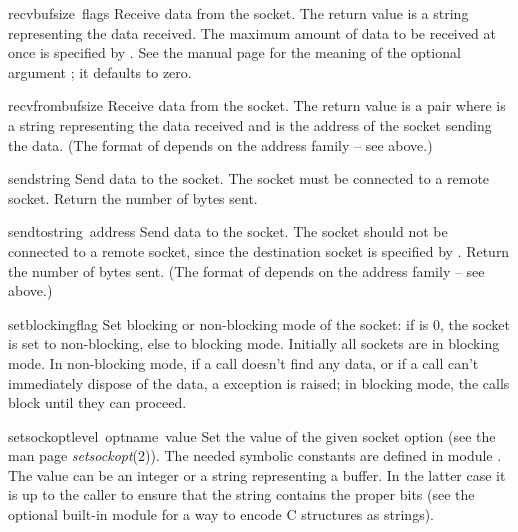 \begin{funcdesc}{recv}{bufsize\, flags}
Receive data from the socket.  The return value is a string representing
the data received.  The maximum amount of data to be received
at once is specified by .  See the \UNIX{} manual page
for the meaning of the optional argument ; it defaults to
zero.
\end{funcdesc}

\begin{funcdesc}{recvfrom}{bufsize}
Receive data from the socket.  The return value is a pair
 where  is a string
representing the data received and  is the address of the
socket sending the data.
(The format of  depends on the address family -- see above.)
\end{funcdesc}

\begin{funcdesc}{send}{string}
Send data to the socket.  The socket must be connected to a remote
socket.  Return the number of bytes sent.
\end{funcdesc}

\begin{funcdesc}{sendto}{string\, address}
Send data to the socket.  The socket should not be connected to a
remote socket, since the destination socket is specified by
.  Return the number of bytes sent.
(The format of  depends on the address family -- see above.)
\end{funcdesc}

\begin{funcdesc}{setblocking}{flag}
Set blocking or non-blocking mode of the socket: if  is 0,
the socket is set to non-blocking, else to blocking mode.  Initially
all sockets are in blocking mode.  In non-blocking mode, if a
 call doesn't find any data, or if a  call can't
immediately dispose of the data, a  exception is
raised; in blocking mode, the calls block until they can proceed.
\end{funcdesc}

\begin{funcdesc}{setsockopt}{level\, optname\, value}
Set the value of the given socket option (see the \UNIX{} man page
{\it setsockopt}(2)).  The needed symbolic constants are defined in module
.  The value can be an integer or a string representing a
buffer.  In the latter case it is up to the caller to ensure that the
string contains the proper bits (see the optional built-in module
 for a way to encode C structures as strings).
\end{funcdesc}

